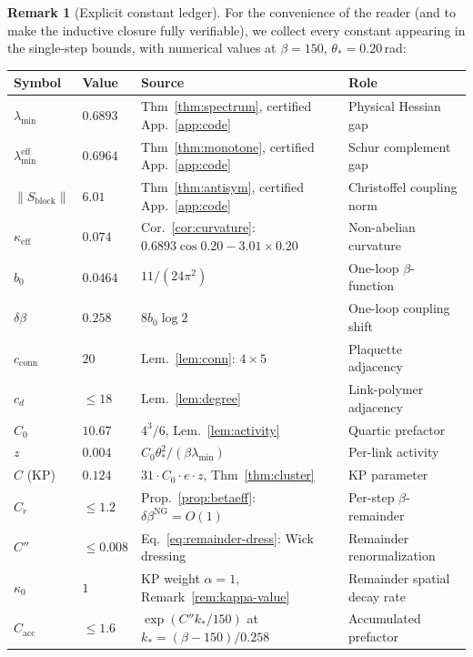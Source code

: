 \documentclass[11pt]{article}
\theoremstyle{definition}
\newtheorem{remark}[theorem]{Remark}
\begin{document}
\begin{remark}[Explicit constant ledger]\label{rem:constant-ledger}
For the convenience of the reader (and to make the inductive closure
fully verifiable), we collect every constant appearing in the
single-step bounds, with numerical values at $\beta=150$,
$\theta_*=0.20$\,rad:

\begin{center}
\renewcommand{\arraystretch}{1.15}
\begin{tabular}{lllp{5cm}}
\toprule
\textbf{Symbol} & \textbf{Value} & \textbf{Source} & \textbf{Role}\\
\midrule
$\lambda_{\min}$ & $0.6893$ &
Thm~\ref{thm:spectrum}, certified App.~\ref{app:code}
& Physical Hessian gap\\
$\lambda_{\min}^{\mathrm{eff}}$ & $0.6964$ &
Thm~\ref{thm:monotone}, certified App.~\ref{app:code}
& Schur complement gap\\
$\|S_{\mathrm{block}}\|$ & $6.01$ &
Thm~\ref{thm:antisym}, certified App.~\ref{app:code}
& Christoffel coupling norm\\
$\kappa_{\mathrm{eff}}$ & $0.074$ &
Cor.~\ref{cor:curvature}: $0.6893\cos0.20-3.01\times0.20$
& Non-abelian curvature\\
$b_0$ & $0.0464$ & $11/(24\pi^2)$ & One-loop $\beta$-function\\
$\delta\beta$ & $0.258$ & $8b_0\log 2$ & One-loop coupling shift\\
$c_{\mathrm{conn}}$ & $20$ & Lem.~\ref{lem:conn}: $4\times 5$
& Plaquette adjacency\\
$c_d$ & $\le 18$ & Lem.~\ref{lem:degree}
& Link-polymer adjacency\\
$C_0$ & $10.67$ & $4^3/6$, Lem.~\ref{lem:activity}
& Quartic prefactor\\
$z$ & $0.004$ & $C_0\theta_*^2/(\beta\lambda_{\min})$
& Per-link activity\\
$C$ (KP) & $0.124$ & $31\cdot C_0\cdot e\cdot z$, Thm~\ref{thm:cluster}
& KP parameter\\
$C_r$ & $\le 1.2$ & Prop.~\ref{prop:betaeff}: $\delta\beta^{\mathrm{NG}}=O(1)$
& Per-step $\beta$-remainder\\
$C''$ & $\le 0.008$ & Eq.~\eqref{eq:remainder-dress}: Wick dressing
& Remainder renormalization\\
$\kappa_0$ & $1$ & KP weight $\alpha=1$,
Remark~\ref{rem:kappa-value}
& Remainder spatial decay rate\\
$C_{\mathrm{acc}}$ & $\le 1.6$ & $\exp(C'' k_*/150)$ at $k_*=(\beta-150)/0.258$
& Accumulated prefactor\\

\end{tabular}
\end{center}
\end{remark}
\end{document}
